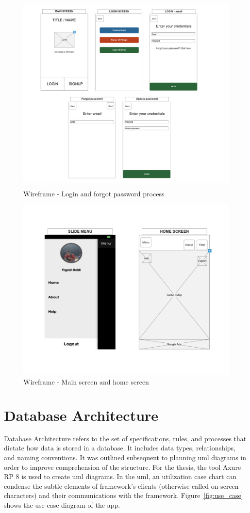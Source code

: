     \begin{figure}[H]
            \centering
            \includegraphics[width=0.75\linewidth]{figures/ch3/wireframe_2.png}
            \caption{\label{fig:wireframe_2} Wireframe - Login and forgot password process}
    \end{figure}
    
    \begin{figure}[H]
            \centering
            \includegraphics[width=0.5\linewidth]{figures/ch3/wireframe_3.png}
            \caption{\label{fig:wireframe_3} Wireframe - Main screen and home screen}
    \end{figure}

\section{Database Architecture}

Database Architecture refers to the set of specifications, rules, and processes that dictate how data is stored in a database. It includes data types, relationships, and naming conventions. It was outlined subsequent to planning \gls{uml} diagrams in order to improve comprehension of the structure. For the thesis, the tool Axure RP 8 is used to create \gls{uml} diagrams. In the \gls{uml}, an utilization case chart can condense the subtle elements of framework's clients (otherwise called on-screen characters) and their communications with the framework. Figure~\ref{fig:use_case} shows the use case diagram of the app.

